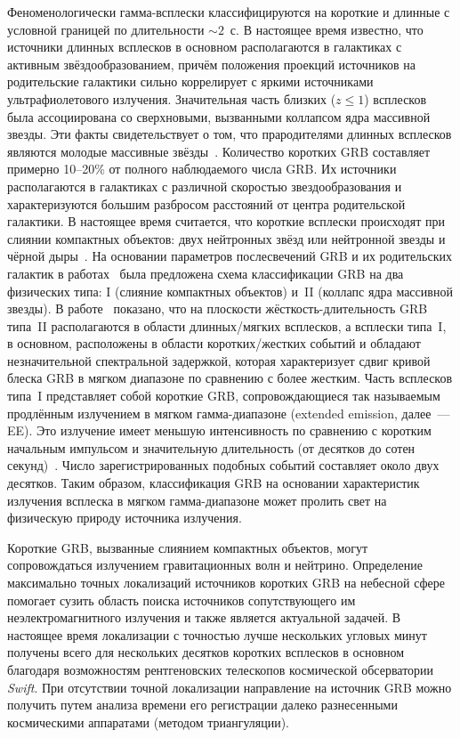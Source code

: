 Феноменологически гамма-всплески классифицируются на короткие и длинные с условной 
границей по длительности $\sim 2$~с. 
В настоящее время известно, что источники длинных всплесков в основном располагаются в галактиках 
с активным звёздообразованием, причём положения проекций источников на родительские галактики сильно
коррелирует с яркими источниками ультрафиолетового излучения. Значительная часть 
близких ($z \le 1$) всплесков была ассоциирована со сверхновыми, вызванными 
коллапсом ядра массивной звезды.
Эти факты свидетельствует о том, что прародителями длинных всплесков являются молодые 
массивные звёзды~\citep{Berger_2014ARAA}.
Количество коротких GRB составляет примерно 10--20\% от полного наблюдаемого числа GRB.
Их источники располагаются в галактиках с различной скоростью 
звездообразования и характеризуются большим разбросом расстояний от центра родительской галактики. 
В настоящее время считается, что короткие всплески происходят при слиянии компактных 
объектов: двух нейтронных звёзд или нейтронной звезды и чёрной дыры~\citep{Berger_2014ARAA}.
На основании параметров послесвечений GRB и их родительских галактик в 
работах~\citep{Zhang_2006,Zhang_2009} была предложена 
схема классификации GRB на два физических типа: I (слияние компактных объектов) 
и~II (коллапс ядра массивной звезды). В работе~\citep{Zhang_2009} показано,
что на плоскости жёсткость-длительность GRB типа~II располагаются в области 
длинных/мягких всплесков, а всплески типа~I, в основном, расположены в области коротких/жестких 
событий и обладают незначительной спектральной задержкой, 
которая характеризует сдвиг кривой блеска GRB в мягком диапазоне по сравнению с более жестким.
Часть всплесков типа~I представляет собой короткие GRB, сопровождающиеся так 
называемым продлённым излучением в мягком гамма-диапазоне  
(extended emission, далее~--- EE). Это излучение имеет меньшую интенсивность 
по сравнению с коротким начальным импульсом и значительную длительность 
(от десятков до сотен секунд)~\citep{Burenin_2000AstL,Frederiks_2004ASPC,Norris_and_Bonnel_2006ApJ}.
Число зарегистрированных подобных событий составляет около двух десятков.
Таким образом, классификация GRB на основании характеристик излучения всплеска 
в мягком гамма-диапазоне может пролить свет на физическую природу источника излучения.

Короткие GRB, вызванные слиянием компактных объектов, могут сопровождаться 
излучением гравитационных волн и нейтрино. Определение максимально точных 
локализаций источников коротких GRB на небесной сфере помогает сузить область поиска источников 
сопутствующего им неэлектромагнитного излучения и также является актуальной задачей. 
В настоящее время локализации с точностью лучше 
нескольких угловых минут получены всего для нескольких десятков коротких всплесков
в основном благодаря возможностям рентгеновских телескопов космической обсерватории \textit{Swift}.
При отсутствии точной локализации направление на источник GRB можно получить путем 
анализа времени его регистрации далеко разнесенными космическими аппаратами (методом триангуляции). 

